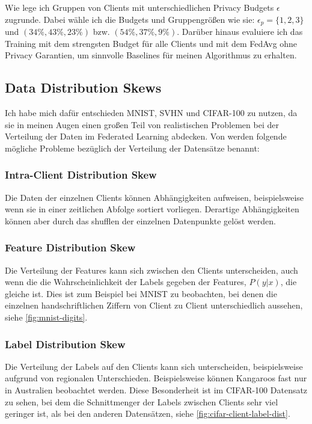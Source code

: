 Wie \textcite{boenisch:2023} lege ich Gruppen von Clients mit unterschiedlichen Privacy Budgets $\epsilon$ zugrunde. Dabei wähle ich die Budgets und Gruppengrößen wie sie: $\epsilon_p = \{1,2,3\}$ und $(34\%, 43\%, 23\%)$ bzw. $(54\%, 37\%, 9\%)$. Darüber hinaus evaluiere ich das Training mit dem strengsten Budget für alle Clients und mit dem FedAvg ohne Privacy Garantien, um sinnvolle Baselines für meinen Algorithmus zu erhalten.

\subsection{Data Distribution Skews}

Ich habe mich dafür entschieden MNIST, SVHN und CIFAR-100 zu nutzen, da sie in meinen Augen einen großen Teil von realistischen Problemen bei der Verteilung der Daten im Federated Learning abdecken. Von \textcite[p. 18f]{kairouz:2021} werden folgende mögliche Probleme bezüglich der Verteilung der Datensätze benannt:

\subsubsection{Intra-Client Distribution Skew}
Die Daten der einzelnen Clients können Abhängigkeiten aufweisen, beispielsweise wenn sie in einer zeitlichen Abfolge sortiert vorliegen. Derartige Abhängigkeiten können aber durch das shufflen der einzelnen Datenpunkte gelöst werden.

\subsubsection{Feature Distribution Skew}
Die Verteilung der Features kann sich zwischen den Clients unterscheiden, auch wenn die die Wahrscheinlichkeit der Labels gegeben der Features, $P(y|x)$, die gleiche ist. Dies ist zum Beispiel bei MNIST zu beobachten, bei denen die einzelnen handschriftlichen Ziffern von Client zu Client unterschiedlich aussehen, siehe \autoref{fig:mnist-digits}.

\subsubsection{Label Distribution Skew}
Die Verteilung der Labels auf den Clients kann sich unterscheiden, beispielsweise aufgrund von regionalen Unterschieden. Beispielsweise können Kangaroos fast nur in Australien beobachtet werden. Diese Besonderheit ist im CIFAR-100 Datensatz zu sehen, bei dem die Schnittmenger der Labels zwischen Clients sehr viel geringer ist, als bei den anderen Datensätzen, siehe \autoref{fig:cifar-client-label-dist}.

